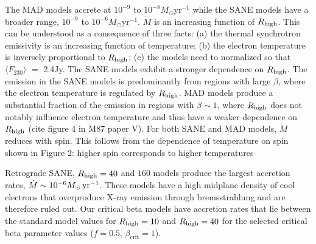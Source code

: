 The MAD models accrete at $10^{-9}$ to $10^{-8} M_{\odot}$yr$^{-1}$ while the SANE models have a broader range, $10^{-9}$ to $10^{-6} M_{\odot}$yr$^{-1}$. $\dot{M}$ is an increasing function of $R_\mathrm{high}$. This can be understood as a consequence of three facts: (a) the thermal synchrotron emissivity is an increasing function of temperature; (b) the electron temperature is inversely proportional to $R_\mathrm{high}$; (c) the models need to normalized so that $\langle F_{230}\rangle$ $=$ 2.4Jy. The SANE models exhibit a stronger dependence on $R_\mathrm{high}$. The emission in the SANE models is predominantly from regions with large $\beta$, where the electron temperature is regulated by $R_\mathrm{high}$. MAD models produce a substantial fraction of the emission in regions with $\beta\sim 1$, where $R_\mathrm{high}$ does not notably influence electron temperature and thus have a weaker dependence on $R_\mathrm{high}$ (cite figure 4 in M87 paper V). For both SANE and MAD models, $\dot{M}$ reduces with spin. This follows from the dependence of temperature on spin shown in Figure 2: higher spin corresponds to higher temperatures

Retrograde SANE, $R_\mathrm{high}=40$ and $160$ models produce the largest accretion rates, $\dot{M} \sim 10^{-6}M_{\odot}\,\mathrm{yr}^{-1}$.  These models have a high midplane density of cool electrons that overproduce X-ray emission through bremsstrahlung and are therefore ruled out.   Our critical beta models have accretion rates that lie between the standard model values for $R_\mathrm{high} = 10$ and $R_\mathrm{high} = 40$ for the selected critical beta parameter values ($f=0.5$, $\beta_\mathrm{crit}=1$).


